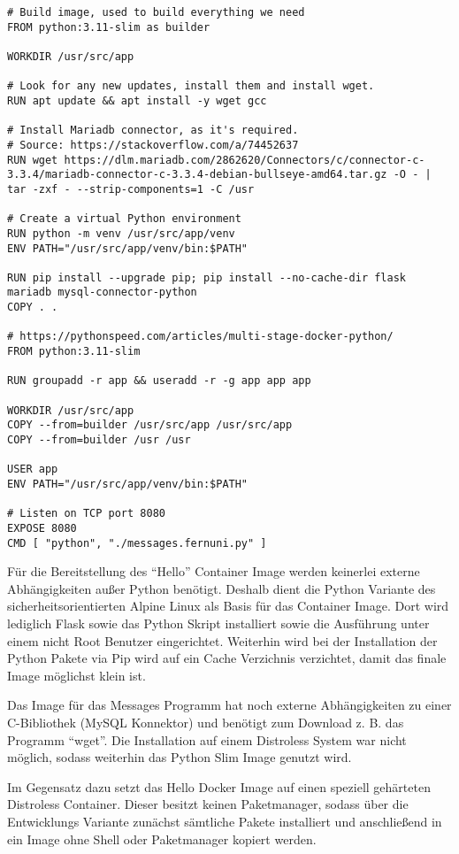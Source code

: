 \begin{verbatim}
# Build image, used to build everything we need
FROM python:3.11-slim as builder

WORKDIR /usr/src/app

# Look for any new updates, install them and install wget.
RUN apt update && apt install -y wget gcc

# Install Mariadb connector, as it's required.
# Source: https://stackoverflow.com/a/74452637
RUN wget https://dlm.mariadb.com/2862620/Connectors/c/connector-c-3.3.4/mariadb-connector-c-3.3.4-debian-bullseye-amd64.tar.gz -O - | tar -zxf - --strip-components=1 -C /usr

# Create a virtual Python environment
RUN python -m venv /usr/src/app/venv
ENV PATH="/usr/src/app/venv/bin:$PATH"

RUN pip install --upgrade pip; pip install --no-cache-dir flask mariadb mysql-connector-python
COPY . .

# https://pythonspeed.com/articles/multi-stage-docker-python/
FROM python:3.11-slim

RUN groupadd -r app && useradd -r -g app app app

WORKDIR /usr/src/app
COPY --from=builder /usr/src/app /usr/src/app
COPY --from=builder /usr /usr

USER app
ENV PATH="/usr/src/app/venv/bin:$PATH"

# Listen on TCP port 8080
EXPOSE 8080
CMD [ "python", "./messages.fernuni.py" ]
\end{verbatim}

Für die Bereitstellung des \enquote{Hello} Container Image werden keinerlei externe Abhängigkeiten außer Python benötigt. Deshalb dient die Python Variante des sicherheitsorientierten Alpine Linux als Basis für das Container Image. Dort wird lediglich Flask sowie das Python Skript installiert sowie die Ausführung unter einem nicht Root Benutzer eingerichtet. Weiterhin wird bei der Installation der Python Pakete via Pip wird auf ein Cache Verzichnis verzichtet, damit das finale Image möglichst klein ist.

Das Image für das Messages Programm hat noch externe Abhängigkeiten zu einer C-Bibliothek (MySQL Konnektor) und benötigt zum Download z. B. das Programm \enquote{wget}. Die Installation auf einem Distroless System war nicht möglich, sodass weiterhin das Python Slim Image genutzt wird.

Im Gegensatz dazu setzt das Hello Docker Image auf einen speziell gehärteten Distroless Container. Dieser besitzt keinen Paketmanager, sodass über die Entwicklungs Variante zunächst sämtliche Pakete installiert und anschließend in ein Image ohne Shell oder Paketmanager kopiert werden.

